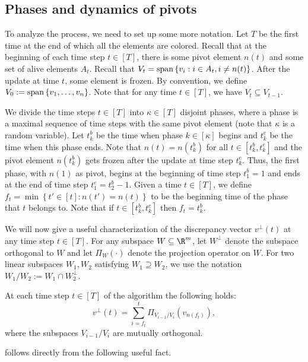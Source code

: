 \documentclass{toc}
\newcommand{\set}[1]{\left\{ #1 \right\}}
\begin{document}
\subsection{Phases and dynamics of pivots}
To analyze the process, we need to set up some more notation. Let $T$ be the first time at the end of which all the elements are colored. Recall that at the
beginning of each time step $t \in [T]$, there is some pivot element $n(t)$ and
some set of alive elements $A_t$. Recall that $V_t = {\rm span}\set{v_i:i\in A_t, i\neq n(t)}$. After the update at time $t$, some element is frozen. By
convention, we define $V_0 := {\rm span}\set{v_1,\ldots,v_n}$. Note that for any time $t \in
[T]$, we have $V_{t} \subseteq V_{t-1}$.%


We divide the time steps $t \in [T]$ into $\kappa \in [T]$ disjoint phases,
where a phase is a maximal sequence of time steps with the same pivot element
(note that $\kappa$ is a random variable). Let $t^b_k$ be the time when phase $k
\in [\kappa]$ begins and $t^e_k$ be the time when this phase ends. Note that
$n(t)=n(t^b_k)$ for all $t \in [t^b_k,t^e_k]$ and the pivot
element $n(t^b_k)$ gets frozen after the update at time step $t^e_k$. Thus, the first
phase, with $n(1)$ as pivot, begins at the beginning of time step $t^b_1=1$ and ends at the end of time step $t^e_1=t^b_2-1$.
Given a time $t \in [T]$, we define $f_t = \min \set{t' \in [t]: n(t') = n(t)}$ to
be the beginning time of the phase that $t$ belongs to. Note that if $t \in
[t^b_k,t^e_k]$ then $f_t = t^b_k$.

We will now give a useful characterization of the discrepancy vector
$v^\perp(t)$ at any time step $t \in [T]$. For any subspace $W \subseteq \R^m$, let $W^{\perp}$ denote the subspace orthogonal to $W$ and
 let $\Pi_{W}(\cdot)$ denote the projection operator on $W$. For two linear subspaces
 $W_1,W_2$ satisfying %
 $W_1  \supseteq W_2$, we use the notation $W_1 / W_2 := W_1 \cap W_2^\perp$.

\begin{lemma}
\label{lem:perpt}
At each time step $t \in [T]$ of the algorithm the following holds:
\begin{equation}
\label{eq:perpt}
v^{\perp}(t) = \sum_{i=f_t}^{t} \Pi_{V_{i-1}/V_i}(v_{n(f_t)}),
\end{equation}
where the subspaces $V_{i-1}/V_i$ are mutually orthogonal.
\end{lemma}

 follows directly from the following useful fact.
\end{document}
